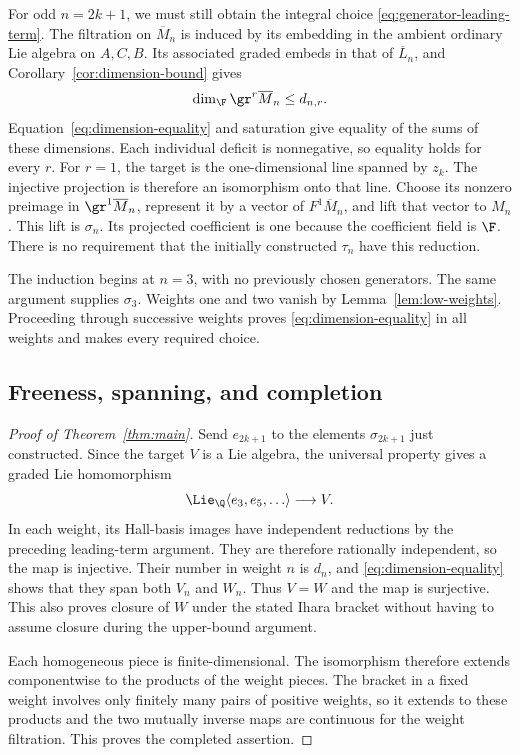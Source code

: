 For odd \(n=2k+1\), we must still obtain the integral choice
\eqref{eq:generator-leading-term}.
The filtration on \(\overline M_n\) is induced by its embedding in
the ambient ordinary Lie algebra on \(A,C,B\).  Its associated
graded embeds in that of \(\overline L_n\), and
Corollary~\ref{cor:dimension-bound} gives
\[
 \dim_\F\gr^r\overline M_n\le d_{n,r}.
\]
Equation~\eqref{eq:dimension-equality} and saturation give equality
of the sums of these dimensions.  Each individual deficit is
nonnegative, so equality holds for every \(r\).
For \(r=1\), the target is the one-dimensional line spanned by
\(z_k\).  The injective projection is therefore an isomorphism
onto that line.
Choose its nonzero preimage in \(\gr^1\overline M_n\), represent
it by a vector of \(F^1\overline M_n\), and lift that vector to
\(M_n\).  This lift is \(\sigma_n\).  Its projected coefficient
is one because the coefficient field is \(\F\).
There is no requirement that the initially constructed
\(\tau_n\) have this reduction.

The induction begins at \(n=3\), with no previously chosen
generators.  The same argument supplies \(\sigma_3\).
Weights one and two vanish by Lemma~\ref{lem:low-weights}.
Proceeding through successive weights proves
\eqref{eq:dimension-equality} in all weights and makes every
required choice.

\subsection{Freeness, spanning, and completion}
\begin{proof}[Proof of Theorem~\ref{thm:main}]
\label{thm:main-proof}
Send \(e_{2k+1}\) to the elements \(\sigma_{2k+1}\) just
constructed.  Since the target \(V\) is a Lie algebra, the
universal property gives a graded Lie homomorphism
\[
 \Lie_\Q\langle e_3,e_5,\ldots\rangle\longrightarrow V.
\]
In each weight, its Hall-basis images have independent
reductions by the preceding leading-term argument.  They are
therefore rationally independent, so the map is injective.
Their number in weight \(n\) is \(d_n\), and
\eqref{eq:dimension-equality} shows that they span both \(V_n\)
and \(W_n\).  Thus \(V=W\) and the map is surjective.
This also proves closure of \(W\) under the stated Ihara bracket
without having to assume closure during the upper-bound argument.

Each homogeneous piece is finite-dimensional.  The isomorphism
therefore extends componentwise to the products of the weight
pieces.  The bracket in a fixed weight involves only finitely
many pairs of positive weights, so it extends to these products
and the two mutually inverse maps are continuous for the weight
filtration.  This proves the completed assertion.
\end{proof}

